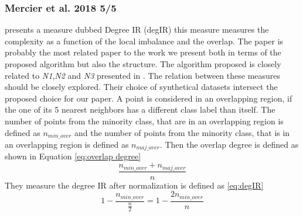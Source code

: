 \subsubsection*{Mercier et al. 2018 5/5}  
\cite{DBLP:conf/ida/MercierSASSS18} presents a measure dubbed Degree IR (degIR) this measure measures the complexity as a function of the local imbalance and the overlap. The paper is probably the most related paper to the work we present both in terms of the proposed algorithm but also the structure. The algorithm proposed is closely related to \emph{N1},\emph{N2} and \emph{N3} presented in \cite{DBLP:journals/isci/BarellaGSLC21}. The relation between these measures should be closely explored. 
Their choice of synthetical datasets intersect the proposed choice for our paper.  A point is considered in an overlapping region, if the one of its 5 nearest neighbors has a different class label than itself. The number of points from the minority class, that are in an overlapping region is defined as $n_{min\_over}$ and the number of points from the minority class, that is in an overlapping region is defined as $n_{maj\_over}$. Then the overlap degree is defined as shown in Equation \ref{eq:overlap degree}
\begin{equation}
\label{eq:overlap degree}
\frac{n_{min\_over} + n_{maj\_over}}{n}
\end{equation}
They measure the degree IR after normalization is defined as \ref{eq:degIR}
\begin{equation}
\label{eq:degIR}
1-\frac{n_{min\_over}}{\frac{n}{2}}=1-\frac{2n_{min\_over}}{n}
\end{equation}

